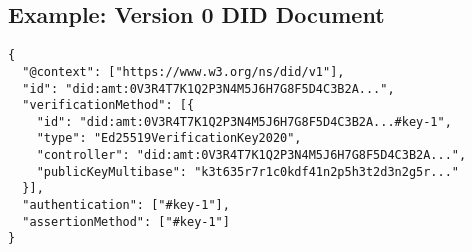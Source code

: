 \subsection{Example: Version 0 DID Document}

\begin{verbatim}
{
  "@context": ["https://www.w3.org/ns/did/v1"],
  "id": "did:amt:0V3R4T7K1Q2P3N4M5J6H7G8F5D4C3B2A...",
  "verificationMethod": [{
    "id": "did:amt:0V3R4T7K1Q2P3N4M5J6H7G8F5D4C3B2A...#key-1",
    "type": "Ed25519VerificationKey2020",
    "controller": "did:amt:0V3R4T7K1Q2P3N4M5J6H7G8F5D4C3B2A...",
    "publicKeyMultibase": "k3t635r7r1c0kdf41n2p5h3t2d3n2g5r..."
  }],
  "authentication": ["#key-1"],
  "assertionMethod": ["#key-1"]
}
\end{verbatim}

